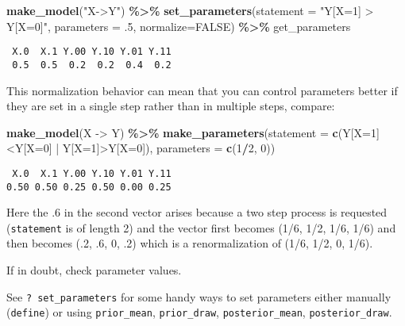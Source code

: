\documentclass[
  12pt,
]{book}
\newenvironment{Shaded}{\begin{snugshade}}{\end{snugshade}}
\newcommand{\AttributeTok}[1]{\textcolor[rgb]{0.13,0.29,0.53}{#1}}
\newcommand{\ConstantTok}[1]{\textcolor[rgb]{0.56,0.35,0.01}{#1}}
\newcommand{\DecValTok}[1]{\textcolor[rgb]{0.00,0.00,0.81}{#1}}
\newcommand{\FunctionTok}[1]{\textcolor[rgb]{0.13,0.29,0.53}{\textbf{#1}}}
\newcommand{\NormalTok}[1]{#1}
\newcommand{\SpecialCharTok}[1]{\textcolor[rgb]{0.81,0.36,0.00}{\textbf{#1}}}
\newcommand{\StringTok}[1]{\textcolor[rgb]{0.31,0.60,0.02}{#1}}
\begin{document}
\begin{Shaded}
\begin{Highlighting}[]
\FunctionTok{make\_model}\NormalTok{(}\StringTok{"X{-}\textgreater{}Y"}\NormalTok{) }\SpecialCharTok{\%\textgreater{}\%}
  \FunctionTok{set\_parameters}\NormalTok{(}\AttributeTok{statement =} \StringTok{"Y[X=1] \textgreater{} Y[X=0]"}\NormalTok{, }\AttributeTok{parameters =}\NormalTok{ .}\DecValTok{5}\NormalTok{, }\AttributeTok{normalize=}\ConstantTok{FALSE}\NormalTok{) }\SpecialCharTok{\%\textgreater{}\%}
\NormalTok{  get\_parameters}
\end{Highlighting}
\end{Shaded}

\begin{verbatim}
 X.0  X.1 Y.00 Y.10 Y.01 Y.11 
 0.5  0.5  0.2  0.2  0.4  0.2 
\end{verbatim}

This normalization behavior can mean that you can control parameters better if they are set in a single step rather than in multiple steps, compare:

\begin{Shaded}
\begin{Highlighting}[]
\FunctionTok{make\_model}\NormalTok{(}\StringTok{\textquotesingle{}X {-}\textgreater{} Y\textquotesingle{}}\NormalTok{) }\SpecialCharTok{\%\textgreater{}\%} 
  \FunctionTok{make\_parameters}\NormalTok{(}\AttributeTok{statement =} \FunctionTok{c}\NormalTok{(}\StringTok{\textquotesingle{}Y[X=1]\textless{}Y[X=0] | Y[X=1]\textgreater{}Y[X=0]\textquotesingle{}}\NormalTok{), }\AttributeTok{parameters =} \FunctionTok{c}\NormalTok{(}\DecValTok{1}\SpecialCharTok{/}\DecValTok{2}\NormalTok{, }\DecValTok{0}\NormalTok{))}
\end{Highlighting}
\end{Shaded}

\begin{verbatim}
 X.0  X.1 Y.00 Y.10 Y.01 Y.11 
0.50 0.50 0.25 0.50 0.00 0.25 
\end{verbatim}

Here the .6 in the second vector arises because a two step process is requested (\texttt{statement} is of length 2) and the vector first becomes (1/6, 1/2, 1/6, 1/6) and then becomes (.2, .6, 0, .2) which is a renormalization of (1/6, 1/2, 0, 1/6).

If in doubt, check parameter values.

See \texttt{?\ set\_parameters} for some handy ways to set parameters either manually (\texttt{define}) or using \texttt{prior\_mean}, \texttt{prior\_draw}, \texttt{posterior\_mean}, \texttt{posterior\_draw}.
\end{document}
